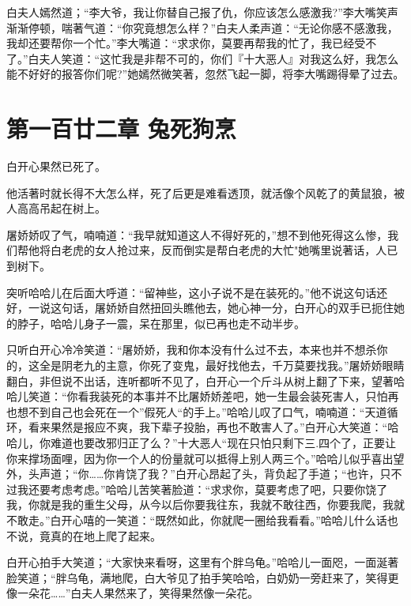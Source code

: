 \documentclass[12pt,oneside]{book}
\begin{document}
白夫人嫣然道；``李大爷，我让你替自己报了仇，你应该怎么感激我?''李大嘴笑声渐渐停顿，喘著气道：``你究竟想怎么样？''白夫人柔声道：``无论你感不感激我，我却还要帮你一个忙。''李大嘴道：``求求你，莫要再帮我的忙了，我已经受不了。''白夫人笑道：``这忙我是非帮不可的，你们『十大恶人』对我这么好，我怎么能不好好的报答你们呢?''她嫣然微笑著，忽然飞起一脚，将李大嘴踢得晕了过去。

\hypertarget{ux7b2cux4e00ux767eux5effux4e8cux7ae0-ux5154ux6b7bux72d7ux70f9}{%
\chapter{第一百廿二章
兔死狗烹}\label{ux7b2cux4e00ux767eux5effux4e8cux7ae0-ux5154ux6b7bux72d7ux70f9}}

白开心果然已死了。

他活著时就长得不大怎么样，死了后更是难看透顶，就活像个风乾了的黄鼠狼，被人高高吊起在树上。

屠娇娇叹了气，喃喃道：``我早就知道这人不得好死的，''想不到他死得这么惨，我们帮他将白老虎的女人抢过来，反而倒实是帮白老虎的大忙"她嘴里说著话，人已到树下。

突听哈哈儿在后面大呼道：``留神些，这小子说不是在装死的。''他不说这句话还好，一说这句话，屠娇娇自然扭回头瞧他去，她心神一分，白开心的双手已扼住她的脖子，哈哈儿身子一震，呆在那里，似已再也走不动半步。

只听白开心冷冷笑道：``屠娇娇，我和你本没有什么过不去，本来也并不想杀你的，这全是阴老九的主意，你死了变鬼，最好找他去，千万莫要找我。''屠娇娇眼睛翻白，非但说不出话，连听都听不见了，白开心一个斤斗从树上翻了下来，望著哈哈儿笑道：``你看我装死的本事并不比屠娇娇差吧，她一生最会装死害人，只怕再也想不到自己也会死在一个''假死人``的手上。''哈哈儿叹了口气，喃喃道：``天道循环，看来果然是报应不爽，我下辈子投胎，再也不敢害人了。''白开心大笑道：``哈哈儿，你难道也要改邪归正了么？''十大恶人``现在只怕只剩下三.四个了，正要让你来撑场面哩，因为你一个人的份量就可以抵得上别人两三个。''哈哈儿似乎喜出望外，头声道；``你\ldots\ldots 你肯饶了我？''白开心昂起了头，背负起了手道；``也许，只不过我还要考虑考虑。''哈哈儿苦笑著脸道：``求求你，莫要考虑了吧，只要你饶了我，你就是我的重生父母，从今以后你要我往东，我就不敢往西，你要我爬，我就不敢走。''白开心嘻的一笑道：``既然如此，你就爬一圈给我看看。''哈哈儿什么话也不说，竟真的在地上爬了起来。

白开心拍手大笑道；``大家快来看呀，这里有个胖乌龟。''哈哈儿一面咫，一面涎著脸笑道；``胖乌龟，满地爬，白大爷见了拍手笑哈哈，白奶奶一旁赶来了，笑得更像一朵花\ldots\ldots{}''白夫人果然来了，笑得果然像一朵花。
\end{document}
